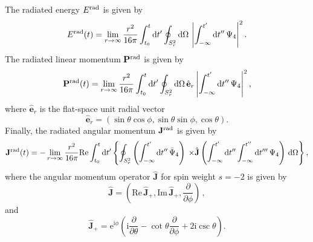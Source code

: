 The radiated energy $E^{\mathrm{rad}}$ is given by
\cite{Campanelli:1998jv,Lousto:2007mh}
\begin{equation}
    E^{\mathrm{rad}}(t) = \lim_{r\to\infty}\frac{r^2}{16\pi}\int_{t_0}^t\mathrm{d} t^\prime
    \oint_{S^2_r}\mathrm{d}\Omega\,\left|\int_{-\infty}^{t^\prime}\mathrm{d} t^{\prime\prime}\,
    \Psi_4\right|^2.\label{bhkick:eq:Erad}
\end{equation}
The radiated linear momentum $\mathbf{P}^{\mathrm{rad}}$ is given by
\begin{equation}
    \mathbf{P}^{\mathrm{rad}}(t) = \lim_{r\to\infty}\frac{r^2}{16\pi}
    \int_{t_0}^t\mathrm{d} t^\prime\oint_{S^2_r}\mathrm{d}\Omega\,
    \hat{\mathbf{e}}_r\left|\int_{-\infty}^{t^\prime}\mathrm{d} t^{\prime\prime}\,
    \Psi_4\right|^2,\label{bhkick:eq:Prad}
\end{equation}
where $\hat{\mathbf{e}}_r$ is the flat-space unit radial vector
\begin{equation}
    \hat{\mathbf{e}}_r = (\sin\theta\cos\phi,\sin\theta\sin\phi,\cos\theta).
\end{equation}
Finally, the radiated angular momentum $\mathbf{J}^{\mathrm{rad}}$ is given by
\begin{equation}
    \mathbf{J}^{\mathrm{rad}}(t) = -
    \lim_{r\to\infty}\frac{r^2}{16\pi}\mathrm{Re}\int_{t_0}^{t}\mathrm{d} t^\prime
    \left\{\oint_{S^2_r}\left(\int_{-\infty}^{t^\prime}\mathrm{d} t^{\prime\prime}\,
    \bar{\Psi}_4\right)\right.
    \left. \times\hat{\mathbf{J}}\left(\int_{-\infty}^{t^\prime}
    \mathrm{d} t^{\prime\prime}\int_{-\infty}^{t^{\prime\prime}}
    \mathrm{d} t^{\prime\prime\prime}\,\Psi_4\right)\,\mathrm{d}\Omega\right\},
    \label{bhkick:eq:Jrad}
\end{equation}
where the angular momentum operator $\hat{\mathbf{J}}$ for spin weight
$s=-2$ is given by
\begin{equation}
    \hat{\mathbf{J}}=\left(\mathrm{Re}\,\hat{\mathbf{J}}_+,\mathrm{Im}\,
    \hat{\mathbf{J}}_+,\frac{\partial}{\partial\phi}\right)\,,
\end{equation}
and
\begin{equation}
    \hat{\mathbf{J}}_+=\mathrm{e}^{\mathrm{i}\phi}\left(\mathrm{i}
    \frac{\partial}{\partial\theta} - \cot\theta\frac{\partial}{\partial\phi}
    + 2\mathrm{i}\csc\theta\right).
\end{equation}

